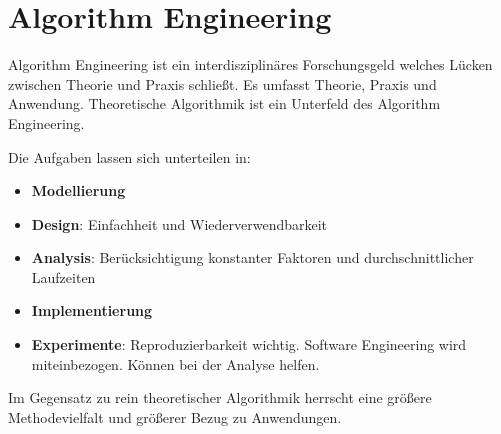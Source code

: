 \chapter{Algorithm Engineering}
Algorithm Engineering ist ein interdisziplinäres Forschungsgeld welches Lücken zwischen Theorie und Praxis schließt. Es umfasst Theorie, Praxis und Anwendung. Theoretische Algorithmik ist ein Unterfeld des Algorithm Engineering.

Die Aufgaben lassen sich unterteilen in:
\begin{itemize}
  \item \textbf{Modellierung} 
  \item \textbf{Design}: Einfachheit und Wiederverwendbarkeit 
  \item \textbf{Analysis}: Berücksichtigung konstanter Faktoren und durchschnittlicher Laufzeiten
  \item \textbf{Implementierung}
  \item \textbf{Experimente}: Reproduzierbarkeit wichtig. Software Engineering wird miteinbezogen. Können bei der Analyse helfen. 
\end{itemize}

Im Gegensatz zu rein theoretischer Algorithmik herrscht eine größere Methodevielfalt und größerer Bezug zu Anwendungen. 

